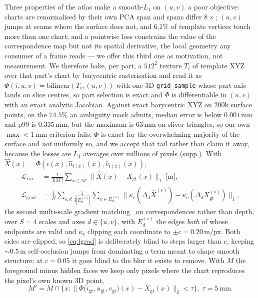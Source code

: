 Three properties of the atlas make a smooth-$L_1$ on $(u,v)$ a poor objective: charts are
renormalised by their own PCA span and spans differ $8\times$; $(u,v)$ jumps at seams where the
surface does not, and $6.1\%$ of template vertices touch more than one chart; and a pointwise loss
constrains the value of the correspondence map but not its spatial derivative, the local geometry
any consumer of a frame reads --- we offer this third one as motivation, not measurement. We
therefore bake, per part, a $512^2$ texture $T_i$ of template XYZ over that part's chart by
barycentric rasterisation and read it as $\Phi(i,u,v)=\mathrm{bilinear}(T_i,(u,v))$ with one 3D
\texttt{grid\_sample} whose part axis lands on slice centres, so part selection is exact and $\Phi$
is differentiable in $(u,v)$ with an exact analytic Jacobian. Against exact barycentric XYZ on
$200$k surface points, on the $74.5\%$ an ambiguity mask admits, median error is below $0.001$\,mm
and p99 is $0.335$\,mm, but the maximum is $63$\,mm on sliver triangles, so our own $\max<1$\,mm
criterion fails: $\Phi$ is exact for the overwhelming majority of the surface and \emph{not}
uniformly so, and we accept that tail rather than claim it away, because the losses are $L_1$
averages over millions of pixels (supp.). With $\hat X(x)=\Phi(i(x),\hat u_{i(x)}(x),\hat
v_{i(x)}(x))$,
\begin{align}
  \mathcal{L}_{\mathrm{xyz}}
    &= \tfrac{1}{3|M'|} \! \sum_{x \in M'} \! \big\lVert \hat X(x) - X_{\mathrm{gt}}(x) \big\rVert_1
    \;\text{[m]}, \label{eq:lxyz}\\
  \mathcal{L}_{\mathrm{grad}}
   &= \tfrac{1}{N} \sum_{s,d} \tfrac{1}{3|E_d^{(s)}|} \!\! \sum_{x \in E_d^{(s)}} \!\!
     \big\lVert \kappa_c(\Delta_d \hat X^{(s)}) - \kappa_c(\Delta_d X^{(s)}_{\mathrm{gt}}) \big\rVert_1 ,
  \label{eq:lgrad}
\end{align}
the second multi-scale gradient
matching~\cite{eigen2015multiscale,li2018megadepth,ranftl2020midas} on correspondences rather than
depth, over $S{=}4$ scales and axes $d\in\{u,v\}$, with $E_d^{(s)}$ the edges \emph{both} of whose
endpoints are valid and $\kappa_c$ clipping each coordinate to $\pm c{=}0.20$\,m/px. Both sides are
clipped, so \cref{eq:lgrad} is deliberately blind to steps larger than $c$, keeping ${\sim}0.5$\,m
self-occlusion jumps from dominating a term meant to shape smooth structure; at $c{=}0.05$ it goes
blind to the blur it exists to remove. With $M$ the foreground minus hidden faces we keep only
pixels where the chart reproduces the pixel's own known $3$D point,
\begin{equation}
  M' \!=\! M \cap \Big\{ x : \big\lVert \Phi\big(i_{\mathrm{gt}},u_{\mathrm{gt}},v_{\mathrm{gt}}\big)(x)
       - X_{\mathrm{gt}}(x) \big\rVert_2 < \tau \Big\},\; \tau{=}5\,\mathrm{mm}.
  \label{eq:valid}
\end{equation}
